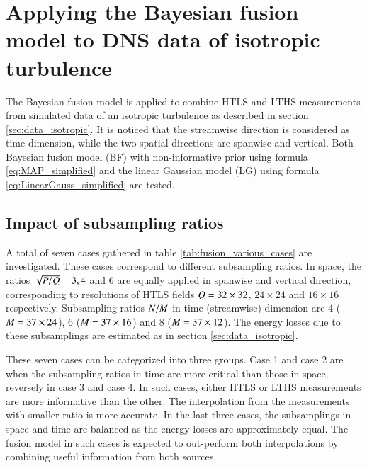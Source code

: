 \section{Applying the Bayesian fusion model to DNS data of isotropic turbulence}
The Bayesian fusion model is applied to combine HTLS and LTHS measurements from simulated data of an isotropic turbulence as described in section \ref{sec:data_isotropic}. It is noticed that the streamwise direction is considered as time dimension, while the two spatial directions are spanwise and vertical. Both Bayesian fusion model (BF) with non-informative prior using formula \ref{eq:MAP_simplified} and the linear Gaussian model (LG) using formula \ref{eq:LinearGauss_simplified} are tested.

\subsection{Impact of subsampling ratios}
\label{subsubsec:impacts_of_subsampling_ratios} 

A total of seven cases gathered in table \ref{tab:fusion_various_cases} are investigated. These cases correspond to different subsampling ratios. In space, the ratios $ \sqrt{P /Q } = 3, 4 $ and $ 6 $ are equally applied in spanwise and vertical direction, corresponding to resolutions of HTLS fields $ Q = 32 \times 32 $, $ 24 \times 24 $ and $ 16 \times 16 $ respectively. Subsampling ratios $ N/M $ in time (streamwise) dimension are 4 ($ M = 37 \times 24$), 6 ($ M = 37 \times 16$) and 8 ($ M = 37 \times 12 $). The energy losses due to these subsamplings are estimated as in section \ref{sec:data_isotropic}. 

These seven cases can be categorized into three groups. Case 1 and case 2 are when the subsampling ratios in time are more critical than those in space, reversely in case 3 and case 4. In such cases, either HTLS or LTHS measurements are more informative than the other. The interpolation from the measurements with smaller ratio is more accurate. In the last three cases, the subsamplings in space and time are balanced as the energy losses are approximately equal. The fusion model in such cases is expected to out-perform both interpolations by combining useful information from both sources.

